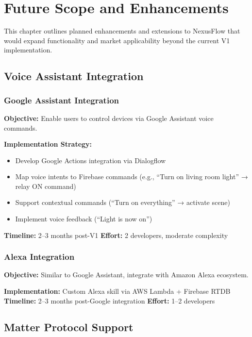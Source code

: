 \chapter{Future Scope and Enhancements}

This chapter outlines planned enhancements and extensions to NexusFlow that would expand functionality and market applicability beyond the current V1 implementation.

\section{Voice Assistant Integration}

\subsection{Google Assistant Integration}

\textbf{Objective:} Enable users to control devices via Google Assistant voice commands.

\textbf{Implementation Strategy:}
\begin{itemize}
    \item Develop Google Actions integration via Dialogflow
    \item Map voice intents to Firebase commands (e.g., ``Turn on living room light'' → relay ON command)
    \item Support contextual commands (``Turn on everything'' → activate scene)
    \item Implement voice feedback (``Light is now on'')
\end{itemize}

\textbf{Timeline:} 2–3 months post-V1
\textbf{Effort:} 2 developers, moderate complexity

\subsection{Alexa Integration}

\textbf{Objective:} Similar to Google Assistant, integrate with Amazon Alexa ecosystem.

\textbf{Implementation:} Custom Alexa skill via AWS Lambda + Firebase RTDB
\textbf{Timeline:} 2–3 months post-Google integration
\textbf{Effort:} 1–2 developers

\section{Matter Protocol Support}

